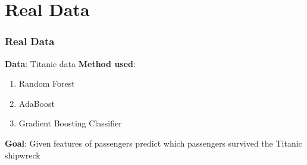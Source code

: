 \section{Real Data}

\begin{frame}[fragile] %
    \frametitle{Real Data}
    \textbf{Data}: Titanic data
\vspace{1ex}
    \newline \textbf{Method used}: 
\vspace{1ex}
    \begin{enumerate}
        \item Random Forest
        \item AdaBoost
        \item Gradient Boosting Classifier
    \end{enumerate}
\vspace{1ex}
    \textbf{Goal}: Given features of passengers predict which passengers survived the Titanic shipwreck
\end{frame}
    

